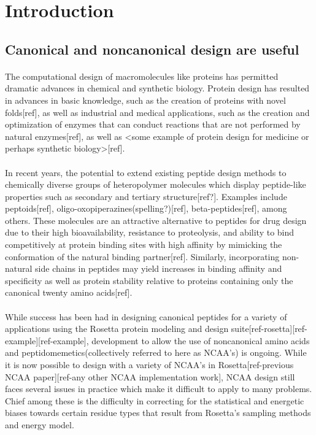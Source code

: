 \section{Introduction}
\subsection{Canonical and noncanonical design are useful}
\paragraph{}
The computational design of macromolecules like proteins has permitted dramatic advances in chemical and synthetic biology.
Protein design has resulted in advances in basic knowledge, such as the creation of proteins with novel folds[ref], as well as industrial and medical applications, such as the creation and optimization of enzymes that can conduct reactions that are not performed by natural enzymes[ref], as well as <some example of protein design for medicine or perhaps synthetic biology>[ref].

\paragraph{}
In recent years, the potential to extend existing peptide design methods to chemically diverse groups of heteropolymer molecules which display peptide-like properties such as secondary and tertiary structure[ref?]. Examples include peptoids[ref], oligo-oxopiperazines(spelling?)[ref], beta-peptides[ref], among others. These molecules are an attractive alternative to peptides for drug design due to their high bioavailability, resistance to proteolysis, and ability to bind competitively at protein binding sites with high affinity by mimicking the conformation of the natural binding partner[ref]. Similarly, incorporating non-natural side chains in peptides may yield increases in binding affinity and specificity as well as protein stability relative to proteins containing only the canonical twenty amino acids[ref].

\paragraph{}
While success has been had in designing canonical peptides for a variety of applications using the Rosetta protein modeling and design suite[ref-rosetta][ref-example][ref-example], development to allow the use of noncanonical amino acids and peptidomemetics(collectively referred to here as NCAA's) is ongoing. While it is now possible to design with a variety of NCAA's in Rosetta[ref-previous NCAA paper][ref-any other NCAA implementation work], NCAA design still faces several issues in practice which make it difficult to apply to many problems. Chief among these is the difficulty in correcting for the statistical and energetic biases towards certain residue types that result from Rosetta's sampling methods and energy model.

